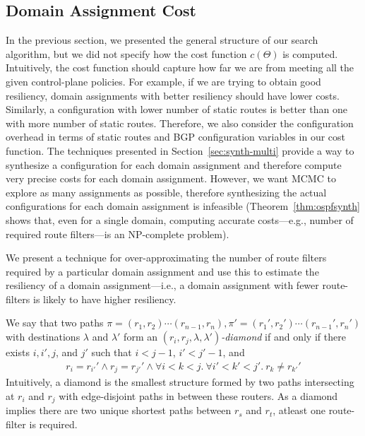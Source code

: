 \subsection{Domain Assignment Cost}
In the previous section, we presented the general structure of our search algorithm,
but we did not specify how the cost function $c(\Theta)$
is computed. Intuitively, the cost function should capture
how far we are from meeting all the given control-plane policies.
For example, if we are trying to obtain good resiliency,
domain assignments with better resiliency should have lower costs.
Similarly, a configuration with lower number of static routes is better
than one with more number of static routes. Therefore, we also consider 
the configuration overhead in terms of static routes and BGP configuration
variables in our cost function.
The techniques presented in Section~\ref{sec:synth-multi} provide a way to 
synthesize a configuration for each domain assignment and therefore compute
very precise costs for each domain assignment. 
However, 
we want MCMC to explore as many assignments as possible,
therefore 
synthesizing the actual configurations for
each domain assignment is infeasible (Theorem~\ref{thm:ospfsynth} shows that, 
even for a single domain, computing accurate costs---e.g., 
number of required route filters---is an NP-complete problem).


We present a technique for over-approximating the number of route 
filters required by a particular domain assignment and use this 
to estimate the resiliency of a domain assignment---i.e., a domain assignment with fewer 
route-filters is likely to have higher resiliency. 


We say that two paths $\pi=(r_1,r_2)\cdots (r_{n-1},r_n), \pi'=(r_1',r_2')\cdots (r_{n-1}',r_n')$ with destinations $\lambda$ and $\lambda'$
form an $(r_i, r_j, \lambda, \lambda')$\emph{-diamond} if and only if
there exists $i,i',j$, and $j'$ such that $i<j-1$, $i'<j'-1$, and
\begin{multline}
r_i{=}r_{i'}' \wedge  r_j{=}r_{j'}' \wedge  \forall i{<}k{<}j.~\forall i'{<}k'{<}j'.~r_{k}{\neq} r_{k'}'  
\end{multline}
Intuitively, a diamond is the smallest structure formed by two
paths intersecting at $r_i$ and $r_j$ with edge-disjoint paths in 
between these routers. 
As a diamond 
implies there are two unique shortest paths between $r_s$ and $r_t$,
atleast one route-filter is required.

